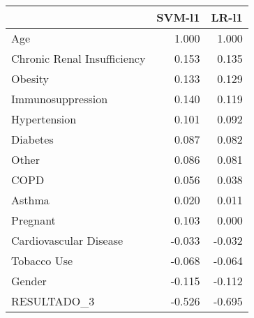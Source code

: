 \begin{tabular}{lrr}
\toprule
{} &  SVM-l1 &  LR-l1 \\
\midrule
Age                         &   1.000 &  1.000 \\
Chronic Renal Insufficiency &   0.153 &  0.135 \\
Obesity                     &   0.133 &  0.129 \\
Immunosuppression           &   0.140 &  0.119 \\
Hypertension                &   0.101 &  0.092 \\
Diabetes                    &   0.087 &  0.082 \\
Other                       &   0.086 &  0.081 \\
COPD                        &   0.056 &  0.038 \\
Asthma                      &   0.020 &  0.011 \\
Pregnant                    &   0.103 &  0.000 \\
Cardiovascular Disease      &  -0.033 & -0.032 \\
Tobacco Use                 &  -0.068 & -0.064 \\
Gender                      &  -0.115 & -0.112 \\
RESULTADO\_3                 &  -0.526 & -0.695 \\
\bottomrule
\end{tabular}
